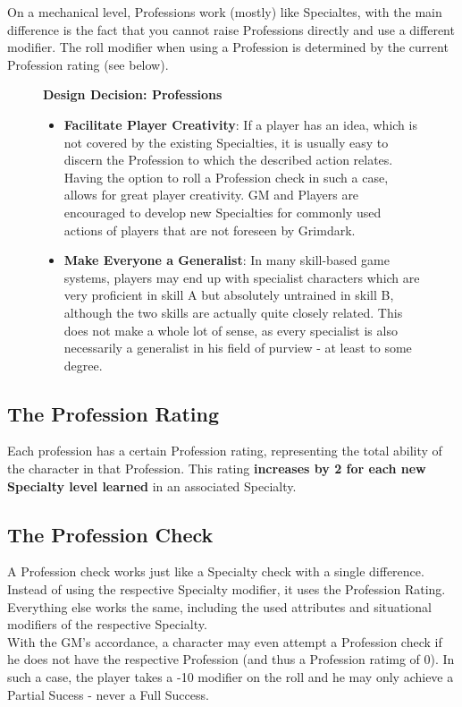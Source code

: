 On a mechanical level, Professions work (mostly) like Specialtes, with the main difference is the fact that you cannot raise Professions directly and use a different modifier.
The roll modifier when using a Profession is determined by the current Profession rating (see below).

\begin{figure}[hb]
	\begin{DndReadAloud}
	\textbf{Design Decision: Professions}
	\begin{itemize}
		\item \textbf{Facilitate Player Creativity}: If a player has an idea, which is not covered by the existing Specialties, it is usually easy to discern the Profession to which the described action relates. Having the option to roll a Profession check in such a case, allows for great player creativity. GM and Players are encouraged to develop new Specialties for commonly used actions of players that are not foreseen by Grimdark.
		\item \textbf{Make Everyone a Generalist}: In many skill-based game systems, players may end up with specialist characters which are very proficient in skill A but absolutely untrained in skill B, although the two skills are actually quite closely related. This does not make a whole lot of sense, as every specialist is also necessarily a generalist in his field of purview - at least to some degree.
		\end{itemize}
	\end{DndReadAloud}
\end{figure}

\subsection{The Profession Rating}
Each profession has a certain Profession rating, representing the total ability of the character in that Profession. 
This rating \textbf{increases by 2 for each new Specialty level learned} in an associated Specialty.

\subsection{The Profession Check}
A Profession check works just like a Specialty check with a single difference.
Instead of using the respective Specialty modifier, it uses the Profession Rating.
Everything else works the same, including the used attributes and situational modifiers of the respective Specialty.\\
With the GM's accordance, a character may even attempt a Profession check if he does not have the respective Profession (and thus a Profession ratimg of 0).
In such a case, the player takes a -10 modifier on the roll and he may only achieve a Partial Sucess - never a Full Success.

